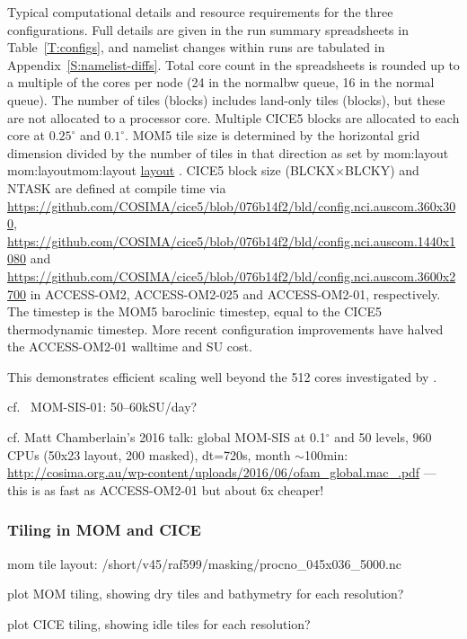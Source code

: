\documentclass[11pt, a4paper]{article}
\makeatletter
\newcommand*{\make@hex@label}[1]{%
  \def\hex@label{#1}%
  \@onelevel@sanitize\hex@label
  \EdefEscapeHex\hex@label{\hex@label}%
}
\newcommand*{\hexhyperlink}[2]{%
  \make@hex@label{#1}%
  \hyperlink{\hex@label}{#2}%
}
\newcommand{\momlink}[2]{\hexhyperlink{mom:#2}{#1}}
\newcommand{\paramsty}[1]{\textsf{#1}}
\newcommand{\param}[1]{\paramsty{#1}\index{\paramsty{#1}}}
\newcommand{\mom}[1]{\paramsty{\momlink{#1}{#1}}\index{\paramsty{#1}}}
\makeatother
\begin{document}
\begin{table}[t]
{Typical computational details and resource requirements for the three configurations.
Full details are given in the run summary spreadsheets in Table~\ref{T:configs}, and namelist changes within runs are tabulated in Appendix~\ref{S:namelist-diffs}.
Total core count in the spreadsheets is rounded up to a multiple of the cores per node (24 in the normalbw queue, 16 in the normal queue).
The number of tiles (blocks) includes land-only tiles (blocks), but these are not allocated to a processor core.
Multiple CICE5 blocks are allocated to each core at $0.25^\circ$ and $0.1^\circ$.
MOM5 tile size is determined by the horizontal grid dimension divided by the number of tiles in that direction as set by \mom{layout}.
CICE5 block size (\param{BLCKX}$\times$\param{BLCKY}) and \param{NTASK} are defined at compile time via 
\url{https://github.com/COSIMA/cice5/blob/076b14f2/bld/config.nci.auscom.360x300},
\url{https://github.com/COSIMA/cice5/blob/076b14f2/bld/config.nci.auscom.1440x1080} and 
\url{https://github.com/COSIMA/cice5/blob/076b14f2/bld/config.nci.auscom.3600x2700}
in ACCESS-OM2, ACCESS-OM2-025 and ACCESS-OM2-01, respectively.
The timestep is the MOM5 baroclinic timestep, equal to the CICE5 thermodynamic timestep.
More recent configuration improvements have halved the ACCESS-OM2-01 walltime and SU cost.
}
\label{T:ComputeResources}
\end{table}

This demonstrates efficient scaling well beyond the 512 cores investigated by \citet{Schmidt2007a}.

cf. \ MOM-SIS-01: 50--60kSU/day?

cf. Matt Chamberlain's 2016 talk: global MOM-SIS at 0.1$^\circ$ and 50 levels, 960 CPUs (50x23 layout, 200 masked), dt=720s, month $\sim$100min: \url{http://cosima.org.au/wp-content/uploads/2016/06/ofam_global.mac_.pdf} --- this is as fast as ACCESS-OM2-01 but about 6x cheaper!

\subsubsection{Tiling in MOM and CICE}

mom tile layout: \paramsty{/short/v45/raf599/masking/procno_045x036_5000.nc}

plot MOM tiling, showing dry tiles and bathymetry for each resolution?

plot CICE tiling, showing idle tiles for each resolution?
\end{document}
